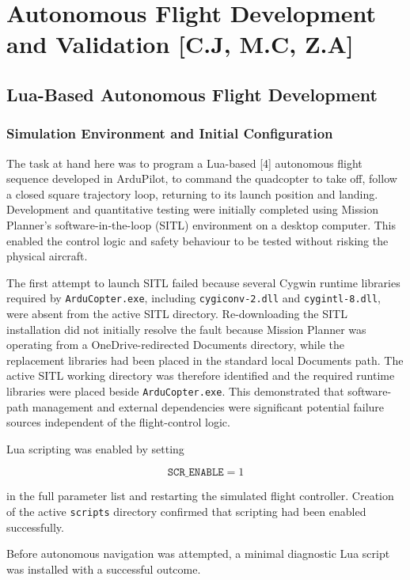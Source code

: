 \documentclass[conference]{IEEEtran}
\begin{document}
\section{Autonomous Flight Development and Validation [C.J, M.C, Z.A]}

\subsection*{Lua-Based Autonomous Flight Development}
\label{sec:lua-development}

\subsubsection*{Simulation Environment and Initial Configuration}
The task at hand here was to program a Lua-based [4] autonomous flight sequence developed in ArduPilot, to command the quadcopter to take off, follow a closed square trajectory loop, returning to its
launch position and landing. Development and quantitative testing were initially completed using Mission Planner's software-in-the-loop (SITL) environment on a desktop computer. This enabled the control logic and safety behaviour to be tested without risking the physical aircraft.

The first attempt to launch SITL failed because several Cygwin runtime libraries required by \texttt{ArduCopter.exe}, including \texttt{cygiconv-2.dll} and \texttt{cygintl-8.dll}, were absent from the
active SITL directory. Re-downloading the SITL installation did not initially resolve the fault because Mission Planner was operating from a
OneDrive-redirected Documents directory, while the replacement libraries had been placed in the standard local Documents path. The active SITL working
directory was therefore identified and the required runtime libraries were placed beside \texttt{ArduCopter.exe}. This demonstrated that software-path management and external dependencies were significant potential failure sources independent of the flight-control logic.

Lua scripting was enabled by setting

\begin{equation}
    \texttt{SCR\_ENABLE}=1
\end{equation}

in the full parameter list and restarting the simulated flight controller.
Creation of the active \texttt{scripts} directory confirmed that scripting had
been enabled successfully.

Before autonomous navigation was attempted, a minimal diagnostic Lua script was installed with a successful outcome.
\end{document}
